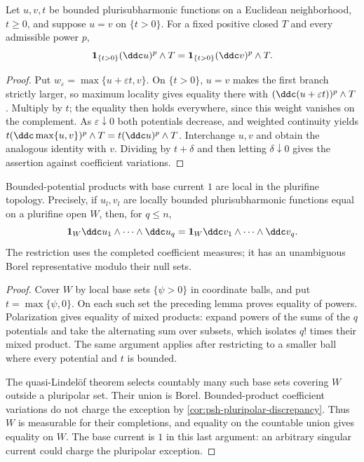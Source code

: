 \begin{lemma}\label{lem:bt-superlevel-locality}
Let $u,v,t$ be bounded plurisubharmonic functions on a Euclidean neighborhood, $t\ge0$, and suppose $u=v$ on $\{t>0\}$. For a fixed positive closed $T$ and every admissible power $p$,
\[
 \mathbf1_{\{t>0\}}(\ddc u)^p\wedge T
       =\mathbf1_{\{t>0\}}(\ddc v)^p\wedge T.
\]
\end{lemma}
\begin{proof}
Put $w_\varepsilon=\max\{u+\varepsilon t,v\}$. On $\{t>0\}$, $u=v$ makes the first branch strictly larger, so maximum locality gives equality there with $(\ddc(u+\varepsilon t))^p\wedge T$. Multiply by $t$; the equality then holds everywhere, since this weight vanishes on the complement. As $\varepsilon\downarrow0$ both potentials decrease, and weighted continuity yields
$t(\ddc\max\{u,v\})^p\wedge T=t(\ddc u)^p\wedge T$.
Interchange $u,v$ and obtain the analogous identity with $v$. Dividing by $t+\delta$ and then letting $\delta\downarrow0$ gives the assertion against coefficient variations.
\end{proof}

\begin{theorem}\label{thm:bt-plurifine-locality}
Bounded-potential products with base current $1$ are local in the plurifine topology. Precisely, if $u_l,v_l$ are locally bounded plurisubharmonic functions equal on a plurifine open $W$, then, for $q\le n$,
\[
 \mathbf1_W\ddc u_1\wedge\cdots\wedge\ddc u_q
     =\mathbf1_W\ddc v_1\wedge\cdots\wedge\ddc v_q.
\]
The restriction uses the completed coefficient measures; it has an unambiguous Borel representative modulo their null sets.
\end{theorem}
\begin{proof}
Cover $W$ by local base sets $\{\psi>0\}$ in coordinate balls, and put $t=\max\{\psi,0\}$. On each such set the preceding lemma proves equality of powers. Polarization gives equality of mixed products: expand powers of the sums of the $q$ potentials and take the alternating sum over subsets, which isolates $q!$ times their mixed product. The same argument applies after restricting to a smaller ball where every potential and $t$ is bounded.

The quasi-Lindel\"of theorem selects countably many such base sets covering $W$ outside a pluripolar set. Their union is Borel. Bounded-product coefficient variations do not charge the exception by \cref{cor:psh-pluripolar-discrepancy}. Thus $W$ is measurable for their completions, and equality on the countable union gives equality on $W$. The base current is $1$ in this last argument: an arbitrary singular current could charge the pluripolar exception.
\end{proof}

